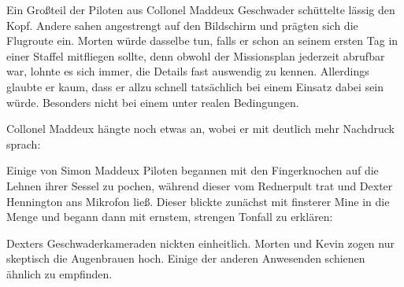 \par

Ein Großteil der Piloten aus Collonel Maddeux Geschwader schüttelte lässig den Kopf. Andere sahen angestrengt auf den Bildschirm und prägten sich die Flugroute ein. Morten würde dasselbe tun, falls er schon an seinem ersten Tag in einer Staffel mitfliegen sollte, denn obwohl der Missionsplan jederzeit abrufbar war, lohnte es sich immer, die Details fast auswendig zu kennen. Allerdings glaubte er kaum, dass er allzu schnell tatsächlich bei einem Einsatz dabei sein würde. Besonders nicht bei einem unter realen Bedingungen.

\par

Collonel Maddeux hängte noch etwas an, wobei er mit deutlich mehr Nachdruck sprach: 

\par

Einige von Simon Maddeux Piloten begannen mit den Fingerknochen auf die Lehnen ihrer Sessel zu pochen, während dieser vom Rednerpult trat und Dexter Hennington ans Mikrofon ließ. Dieser blickte zunächst mit finsterer Mine in die Menge und begann dann mit ernstem, strengen Tonfall zu erklären: 

\par

Dexters Geschwaderkameraden nickten einheitlich. Morten und Kevin zogen nur skeptisch die Augenbrauen hoch. Einige der anderen Anwesenden schienen ähnlich zu empfinden.

\par

